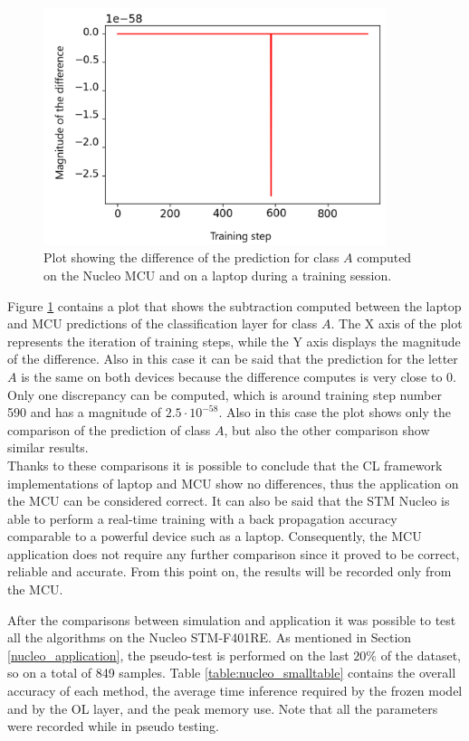 \documentclass[12pt]{report}
\begin{document}
\begin{figure}[h!]
    \centering
    \includegraphics[width=100mm]{Figures/Chapter5/softmax_example.png} 
    \caption{Plot showing the difference of the prediction for class $A$ computed on the Nucleo MCU and on a laptop during a training session.}
    \label{fig:comparison_softmax}    
\end{figure}

Figure \ref{fig:comparison_softmax} contains a plot that shows the subtraction computed between the laptop and MCU predictions of the classification layer for class $A$. The X axis of the plot represents the iteration of training steps, while the Y axis displays the magnitude of the difference. Also in this case it can be said that the prediction for the letter $A$ is the same on both devices because the difference computes is very close to 0. Only one discrepancy can be computed, which is around training step number 590 and has a magnitude of $2.5 \cdot 10^{-58}$. Also in this case the plot shows only the comparison of the prediction of class $A$, but also the other comparison show similar results.\\
Thanks to these comparisons it is possible to conclude that the CL framework implementations of laptop and MCU show no differences, thus the application on the MCU can be considered correct. It can also be said that the STM Nucleo is able to perform a real-time training with a back propagation accuracy comparable to a powerful device such as a laptop. Consequently, the MCU application does not require any further comparison since it proved to be correct, reliable and accurate. From this point on, the results will be recorded only from the MCU.\bigskip

After the comparisons between simulation and application it was possible to test all the algorithms on the Nucleo STM-F401RE. As mentioned in Section \ref{nucleo_application}, the pseudo-test is performed on the last $20\%$ of the dataset, so on a total of 849 samples. Table \ref{table:nucleo_smalltable} contains the overall accuracy of each method, the average time inference required by the frozen model and by the OL layer, and the peak memory use. Note that all the parameters were recorded while in pseudo testing. \\
\end{document}
